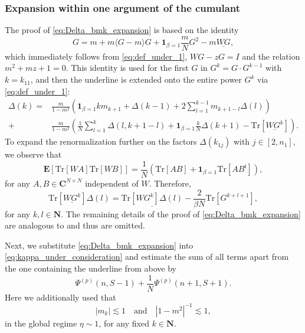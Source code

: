 \documentclass[10pt]{amsart}
\numberwithin{equation}{section}
\newcommand{\E}{\mathbf{E}}
\newcommand{\C}{\mathbf{C}}
\newcommand{\N}{\mathbf{N}}
\begin{document}
\subsubsection{Expansion within one argument of the cumulant}\label{sec:expansion_1arg} The proof of \eqref{eq:Delta_bmk_expansion} is based on the identity
\begin{equation}
G = m+ m\langle G-m\rangle G +\bm{1}_{\beta=1} \frac{m}{N}G^2 -m\underline{WG},
\label{eq:G_underline}
\end{equation}
which immediately follows from \eqref{eq:def_under_1}, $WG- zG =I$ and the relation $m^2 +mz+1=0$. This identity is used for the first $G$ in $G^k=G\cdot G^{k-1}$ with $k=k_{11}$, and then the underline is extended onto the entire power $G^{k}$ via \eqref{eq:def_under_1}:
\begin{equation}
\begin{split}
\Delta(k) =& \frac{m}{1-m^2}\left(\bm{1}_{\beta=1}km_{k+1} + \Delta(k-1) + 2\sum_{l=1}^{k-1} m_{k+1-l} \Delta(l)\right)\\
 +&\frac{m}{1-m^2}\left(\frac{1}{N}\sum_{l=1}^k\Delta(l,k+1-l) + \bm{1}_{\beta=1} \frac{k}{N}\Delta(k+1) - \mathrm{Tr}\left[\underline{WG^k}\right]\right).
\end{split}
\label{eq:Delta_k}
\end{equation}
To expand the renormalization further on the factors $\Delta(k_{1j})$ with $j\in [2,n_1]$, we observe that
\begin{equation}
\E\left[\mathrm{Tr}[WA]\mathrm{Tr}[WB]\right] = \frac{1}{N}\left(\mathrm{Tr}[AB] +\bm{1}_{\beta=1}\mathrm{Tr}[AB^\mathfrak{t}]\right),
\label{eq:EWW}
\end{equation}
for any $A,B\in\C^{N\times N}$ independent of $W$. Therefore,
\begin{equation}
\mathrm{Tr}\left[\underline{WG^k}\right] \Delta(l) = \underline{\mathrm{Tr}[WG^k]\Delta(l)}  -\frac{2}{\beta N} \mathrm{Tr}\left[G^{k+l+1}\right],
\label{eq:under_extension_basic}
\end{equation}
for any $k,l\in \N$. The remaining details of the proof of \eqref{eq:Delta_bmk_expansion} are analogous to \cite[Eq.(7.44)-(7.47)]{hyperuniformity} and thus are omitted.


Next, we substitute \eqref{eq:Delta_bmk_expansion} into \eqref{eq:kappa_under_consideration} and estimate the sum of all terms apart from the one containing the underline from above by 
\begin{equation}
\Psi^{(p)}(n,S-1)+\frac{1}{N}\Psi^{(p)}(n+1,S+1).
\label{eq:err_1_1}
\end{equation}
Here we additionally used that
\begin{equation}
| m_k|\lesssim 1\quad\text{and}\quad \left\vert 1-m^2\right\vert^{-1}\lesssim 1,
\end{equation}
in the global regime $\eta\sim 1$, for any fixed $k\in\N$.
\end{document}
